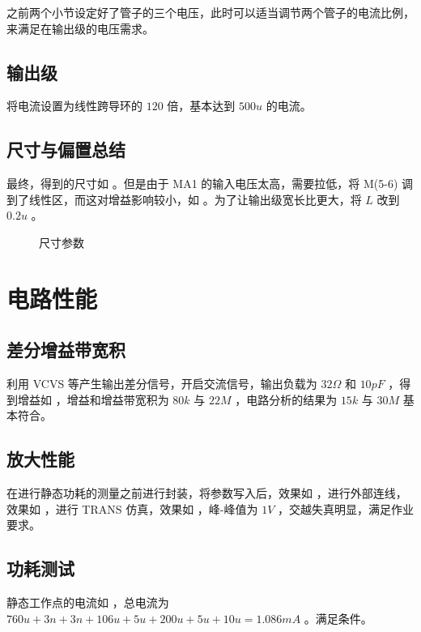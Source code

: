 \documentclass[lang=cn,11pt,a4paper,cite=authoryear]{elegantpaper}
\begin{document}
之前两个小节设定好了管子的三个电压，此时可以适当调节两个管子的电流比例，来满足在输出级的电压需求。

\subsection{输出级} 

将电流设置为线性跨导环的 \(120\) 倍，基本达到 \(500 u\) 的电流。

\subsection*{尺寸与偏置总结}

最终，得到的尺寸如  。但是由于 MA1 的输入电压太高，需要拉低，将 M(5-6) 调到了线性区，而这对增益影响较小，如  。为了让输出级宽长比更大，将 \(L\) 改到 \(0.2 u\) 。

\begin{figure}
    \caption{尺寸参数}\label{0304}
    \centering
\end{figure}


\section{电路性能}

\subsection{差分增益带宽积}

利用 VCVS 等产生输出差分信号，开启交流信号，输出负载为 \(32 \Omega\) 和 \(10 pF\) ，得到增益如  ，增益和增益带宽积为 \(80k\) 与 \(22 M\) ，电路分析的结果为 \(15 k\) 与 \(30 M\) 基本符合。


\subsection{放大性能} 

在进行静态功耗的测量之前进行封装，将参数写入后，效果如  ，进行外部连线，效果如  ，进行 TRANS 仿真，效果如  ，峰-峰值为 \(1 V\) ，交越失真明显，满足作业要求。




\subsection{功耗测试}

静态工作点的电流如  ，总电流为\(760u + 3n + 3n + 106u + 5u + 200u + 5u + 10u = 1.086 mA\) 。满足条件。

\end{document}
